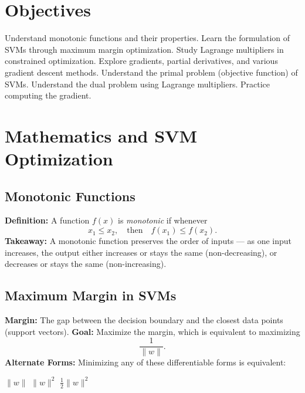 
\section*{Objectives}
\begin{outline}
    \1 Understand monotonic functions and their properties.
    \1 Learn the formulation of SVMs through maximum margin optimization.
    \1 Study Lagrange multipliers in constrained optimization.
    \1 Explore gradients, partial derivatives, and various gradient descent methods.
    \1 Understand the primal problem (objective function) of SVMs.
    \1 Understand the dual problem using Lagrange multipliers.
    \1 Practice computing the gradient.
\end{outline}

\section{Mathematics and SVM Optimization}

\subsection{Monotonic Functions}
\begin{outline}
    \1 \textbf{Definition:} A function \( f(x) \) is \emph{monotonic} if whenever 
    \[
    x_1 \leq x_2, \quad \text{then} \quad f(x_1) \leq f(x_2).
    \]
    \1 \textbf{Takeaway:} A monotonic function preserves the order of inputs — as one input increases, the output either increases or stays the same (non-decreasing), 
    or decreases or stays the same (non-increasing).
\end{outline}

\subsection{Maximum Margin in SVMs}
\begin{outline}
    \1 \textbf{Margin:} The gap between the decision boundary and the closest data points (support vectors).
    \1 \textbf{Goal:} Maximize the margin, which is equivalent to maximizing 
    \[
    \frac{1}{\|w\|}.
    \]
    \1 \textbf{Alternate Forms:} Minimizing any of these differentiable forms is equivalent:
    \begin{outline}
        \1 \(\|w\|\)
        \1 \(\|w\|^2\)
        \1 \(\frac{1}{2}\|w\|^2\)
    \end{outline}
\end{outline}

